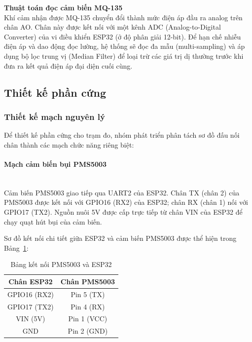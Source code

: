 \documentclass[12pt,a4paper]{article}
\begin{document}
\noindent\textbf{Thuật toán đọc cảm biến MQ-135}\\[6pt]
Khí cảm nhận được MQ-135 chuyển đổi thành mức điện áp đầu ra analog trên chân AO. Chân này được kết nối với một kênh ADC (Analog-to-Digital Converter) của vi điều khiển ESP32 (ở độ phân giải 12-bit). Để hạn chế nhiễu điện áp và dao động đọc lường, hệ thống sẽ đọc đa mẫu (multi-sampling) và áp dụng bộ lọc trung vị (Median Filter) để loại trừ các giá trị dị thường trước khi đưa ra kết quả điện áp đại diện cuối cùng.

\subsection{Thiết kế phần cứng}

\subsubsection{Thiết kế mạch nguyên lý}
Để thiết kế phần cứng cho trạm đo, nhóm phát triển phân tách sơ đồ đấu nối chân thành các mạch chức năng riêng biệt:

\paragraph{Mạch cảm biến bụi PMS5003}\mbox{}\\
Cảm biến PMS5003 giao tiếp qua UART2 của ESP32. Chân TX (chân 2) của PMS5003 được kết nối với GPIO16 (RX2) của ESP32; chân RX (chân 1) nối với GPIO17 (TX2). Nguồn nuôi 5V được cấp trực tiếp từ chân VIN của ESP32 để chạy quạt hút bụi của cảm biến.

Sơ đồ kết nối chi tiết giữa ESP32 và cảm biến PMS5003 được thể hiện trong Bảng~\ref{tab:schematic_pms5003}:

\begin{table}[H]
    \centering
    \begin{tabular}{|c|c|}
        \hline
        \textbf{Chân ESP32} & \textbf{Chân PMS5003} \\
        \hline
        GPIO16 (RX2) & Pin 5 (TX) \\
        \hline
        GPIO17 (TX2) & Pin 4 (RX) \\
        \hline
        VIN (5V) & Pin 1 (VCC) \\
        \hline
        GND & Pin 2 (GND) \\
        \hline
    \end{tabular}
    \caption{Bảng kết nối PMS5003 và ESP32}
    \label{tab:schematic_pms5003}
\end{table}
\end{document}
